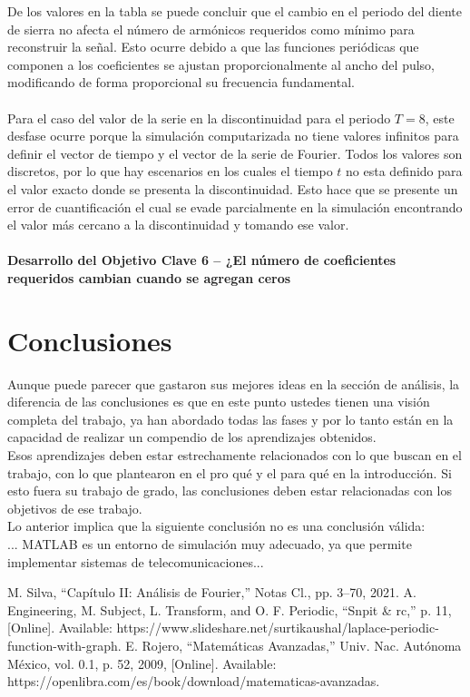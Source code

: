 \documentclass[8pt]{article}
\begin{document}
    De los valores en la tabla se puede concluir que el cambio en el periodo del diente de 
    sierra no afecta el número de armónicos requeridos como mínimo para reconstruir la 
    señal. Esto ocurre debido a que las funciones periódicas que componen a los coeficientes 
    se ajustan proporcionalmente al ancho del pulso, modificando de forma proporcional su 
    frecuencia fundamental.\\
    \\
    Para el caso del valor de la serie en la discontinuidad para el periodo $T=8$, este desfase 
    ocurre porque la simulación computarizada no tiene valores infinitos para definir el vector 
    de tiempo y el vector de la serie de Fourier. Todos los valores son discretos, por lo que hay 
    escenarios en los cuales el tiempo $t$ no esta definido para el valor exacto donde se 
    presenta la discontinuidad. Esto hace que se presente un error de cuantificación el cual se 
    evade parcialmente en la simulación encontrando el valor más cercano a la discontinuidad 
    y tomando ese valor.\\
    \\
    \textbf{Desarrollo del Objetivo Clave 6 -- ¿El número de coeficientes requeridos cambian cuando se agregan ceros}

\section*{Conclusiones}
    Aunque puede parecer que gastaron sus mejores ideas en la sección de análisis, la 
    diferencia de las conclusiones es que en este punto ustedes tienen una visión completa 
    del trabajo, ya han abordado todas las fases y por lo tanto están en la capacidad de 
    realizar un compendio de los aprendizajes obtenidos.\\
    Esos aprendizajes deben estar estrechamente relacionados con lo que buscan en el 
    trabajo, con lo que plantearon en el pro qué y el para qué en la introducción. Si esto fuera 
    su trabajo de grado, las conclusiones deben estar relacionadas con los objetivos de ese 
    trabajo.\\
    Lo anterior implica que la siguiente conclusión no es una conclusión válida:\\
    ... MATLAB es un entorno de simulación muy adecuado, ya que permite implementar 
    sistemas de telecomunicaciones...

\begin{thebibliography}{99}
        M. Silva, “Capítulo II: Análisis de Fourier,” Notas Cl., pp. 3–70, 2021.
        A. Engineering, M. Subject, L. Transform, and O. F. Periodic, “Snpit \& rc,” p. 11, [Online]. Available: https://www.slideshare.net/surtikaushal/laplace-periodic-function-with-graph.
        E. Rojero, “Matemáticas Avanzadas,” Univ. Nac. Autónoma México, vol. 0.1, p. 52, 2009, [Online]. Available: https://openlibra.com/es/book/download/matematicas-avanzadas.
\end{thebibliography}
\end{document}
